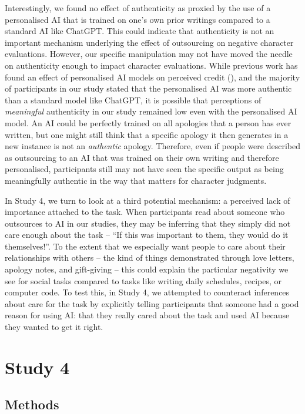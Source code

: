 \documentclass[
  man,
  floatsintext,
  longtable,
  nolmodern,
  notxfonts,
  notimes,
  colorlinks=true,linkcolor=blue,citecolor=blue,urlcolor=blue]{apa7}
\begin{document}
Interestingly, we found no effect of authenticity as proxied by the use
of a personalised AI that is trained on one's own prior writings
compared to a standard AI like ChatGPT. This could indicate that
authenticity is not an important mechanism underlying the effect of
outsourcing on negative character evaluations. However, our specific
manipulation may not have moved the needle on authenticity enough to
impact character evaluations. While previous work has found an effect of
personalised AI models on perceived credit (), and the majority of participants in our study stated
that the personalised AI was more authentic than a standard model like
ChatGPT, it is possible that perceptions of \emph{meaningful}
authenticity in our study remained low even with the personalised AI
model. An AI could be perfectly trained on all apologies that a person
has ever written, but one might still think that a specific apology it
then generates in a new instance is not an \emph{authentic} apology.
Therefore, even if people were described as outsourcing to an AI that
was trained on their own writing and therefore personalised,
participants still may not have seen the specific output as being
meaningfully authentic in the way that matters for character judgments.

In Study 4, we turn to look at a third potential mechanism: a perceived
lack of importance attached to the task. When participants read about
someone who outsources to AI in our studies, they may be inferring that
they simply did not care enough about the task -- ``If this was
important to them, they would do it themselves!''. To the extent that we
especially want people to care about their relationships with others --
the kind of things demonstrated through love letters, apology notes, and
gift-giving -- this could explain the particular negativity we see for
social tasks compared to tasks like writing daily schedules, recipes, or
computer code. To test this, in Study 4, we attempted to counteract
inferences about care for the task by explicitly telling participants
that someone had a good reason for using AI: that they really cared
about the task and used AI because they wanted to get it right.

\section*{Study 4}\label{study-4}

\subsection*{Methods}\label{methods-3}
\end{document}
